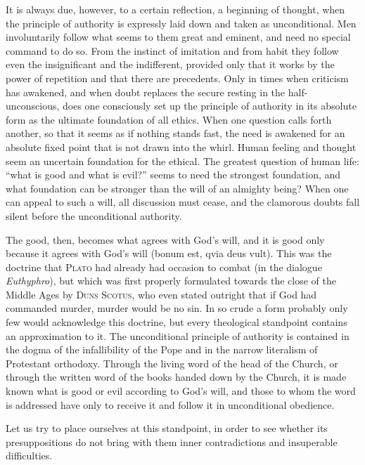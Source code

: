 \documentclass[12pt,a4paper,openany]{book}
\newcommand{\opage}[1]{\marginnote{\footnotesize\textit{[#1]}}}
\begin{document}
\opage{15}It is always due, however, to a certain reflection, a beginning of thought, when the principle of
authority is expressly laid down and taken as unconditional. Men involuntarily follow what seems to
them great and eminent, and need no special command to do so. From the instinct of imitation and
from habit they follow even the insignificant and the indifferent, provided only that it works by
the power of repetition and that there are precedents. Only in times when criticism has awakened,
and when doubt replaces the secure resting in the half-unconscious, does one consciously set up the
principle of authority in its absolute form as the ultimate foundation of all ethics. When one
question calls forth another, so that it seems as if nothing stands fast, the need is awakened for
an absolute fixed point that is not drawn into the whirl. Human feeling and thought seem an
uncertain foundation for the ethical. The greatest question of human life: ``what is good and what
is evil?'' seems to need the strongest foundation, and what foundation can be stronger than the will
of an almighty being? When one can appeal to such a will, all discussion must cease, and the
clamorous doubts fall silent before the unconditional authority.

The good, then, becomes what agrees with God's will, and it is good only because it agrees with
God's will (bonum est, qvia deus vult). This was the doctrine that \textsc{Plato} had already had
occasion to combat (in the dialogue \textit{Euthyphro}), but which was first properly formulated
towards the close of the Middle Ages by \textsc{Duns Scotus}, who even stated outright that if God
had commanded murder, murder would be no sin. In so crude a form probably only few would acknowledge
this doctrine, but every theological standpoint contains an approximation to it. The unconditional
principle of authority is contained in the dogma of the infallibility of the Pope and in the narrow
literalism of Protestant orthodoxy. Through the living word of the head of the Church, or through the
written word of the books handed down by the Church, it is made known what is good or evil according
to God's will, and those to whom the word is addressed have only to receive it and follow it in
unconditional obedience.

Let us try to place ourselves at this standpoint, in order to see
\opage{16}whether its presuppositions do not bring with them inner contradictions and insuperable
difficulties.
\end{document}
